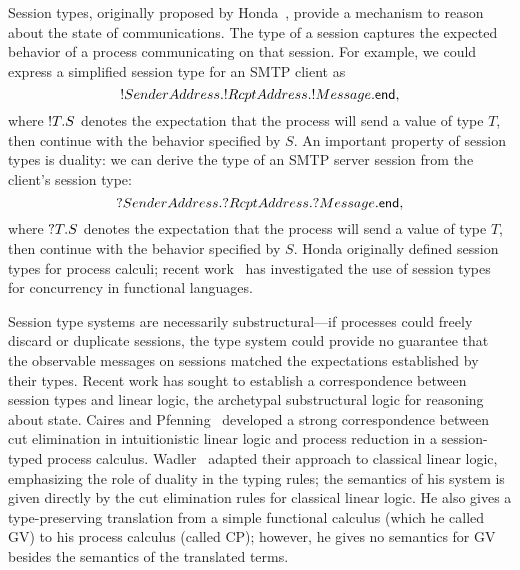 \documentclass[oribibl,orivec,envcountsame]{llncs}
\begin{document}
Session types, originally proposed by Honda~\cite{Honda93}, provide a mechanism to reason about the
state of communications.  The type of a session captures the expected behavior of a process
communicating on that session.  For example, we could express a simplified session type for an SMTP
client as
\[
  {!SenderAddress.{!RcptAddress.{!Message.\mathsf{end}}}},
\]
where ${!T.S}$ denotes the expectation that the process will send a value of type $T$, then
continue with the behavior specified by $S$. An important property of session types is duality: we
can derive the type of an SMTP server session from the client's session type:
\[
  {?SenderAddress.{?RcptAddress.{?Message.\mathsf{end}}}},
\]
where ${?T.S}$ denotes the expectation that the process will send a value of type $T$, then
continue with the behavior specified by $S$.  Honda originally defined session types for process
calculi; recent work~\cite{VasconcelosGR06,GayVasconcelos10} has investigated the use of session
types for concurrency in functional languages.

Session type systems are necessarily substructural---if processes could freely discard or duplicate
sessions, the type system could provide no guarantee that the observable messages on sessions
matched the expectations established by their types.  Recent work has sought to establish a
correspondence between session types and linear logic, the archetypal substructural logic for
reasoning about state.  Caires and Pfenning~\cite{CairesPfenning10} developed a strong
correspondence between cut elimination in intuitionistic linear logic and process reduction in a
session-typed process calculus. Wadler~\cite{Wadler14} adapted their approach to classical linear
logic, emphasizing the role of duality in the typing rules; the semantics of his system is given
directly by the cut elimination rules for classical linear logic. He also gives a type-preserving
translation from a simple functional calculus (which he called GV) to his process calculus (called
CP); however, he gives no semantics for GV besides the semantics of the translated terms.
\end{document}
